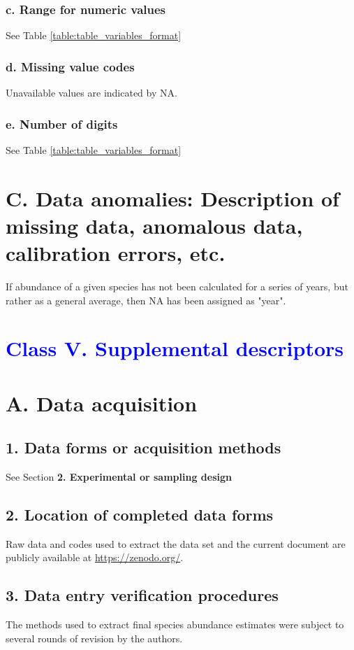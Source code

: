\documentclass[a4paper,twoside,12pt]{article}
\begin{document}
                    \subsubsection*{c. Range for numeric values} See Table \ref{table:table_variables_format}
                    \subsubsection*{d. Missing value codes} Unavailable values are indicated by NA.
                    \subsubsection*{e. Number of digits} See Table \ref{table:table_variables_format}
            \newpage
            
           
			\newpage
        
 \section*{C. Data anomalies: Description of missing data, anomalous data, calibration errors, etc.}
  If abundance of a given species has not been calculated for a series of years, but rather as a general average, then NA has been assigned as "year".
 
 \section*{\textcolor{Blue}{Class V. Supplemental descriptors}}
    \section*{A. Data acquisition}
    		\subsection*{1. Data forms or acquisition methods}
   		See Section \textbf{2. Experimental or sampling design} 
   		\subsection*{2. Location of completed data forms}
        Raw data and codes used to extract the data set and the current document are publicly available at \url{https://zenodo.org/}.
        \subsection*{3. Data entry verification procedures}
       	The methods used to extract final species abundance estimates were subject to several rounds of revision by the authors.
       	
\end{document}
